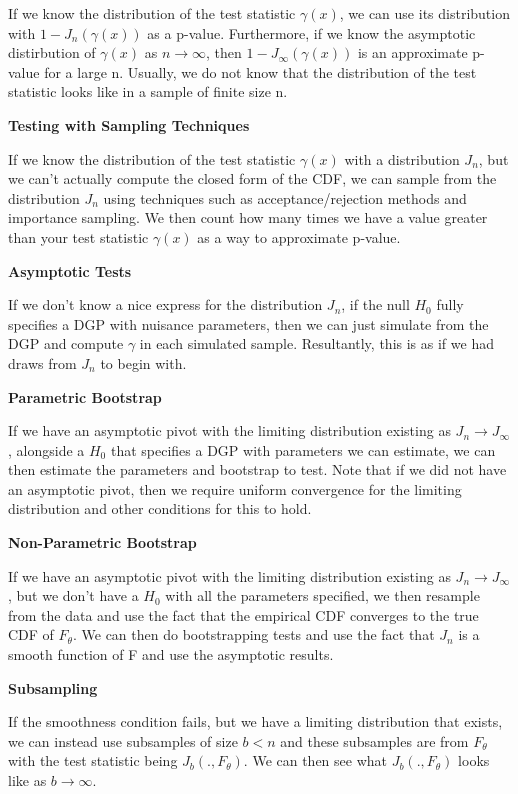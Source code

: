 \documentclass[twoside]{article}
\begin{document}
If we know the distribution of the test statistic $\gamma(x)$, we can use its distribution with $1 - J_n(\gamma(x))$ as a p-value. Furthermore, if we know the asymptotic distirbution of $\gamma(x)$ as $n \rightarrow \infty$, then $1 - J_{\infty}(\gamma(x))$ is an approximate p-value for a large n. Usually, we do not know that the distribution of the test statistic looks like in a sample of finite size n.

\bigskip
\textbf{Testing with Sampling Techniques}

If we know the distribution of the test statistic $\gamma(x)$ with a distribution $J_n$, but we can't actually compute the closed form of the CDF, we can sample from the distribution $J_n$ using techniques such as acceptance/rejection methods and importance sampling. We then count how many times we have a value greater than your test statistic $\gamma(x)$ as a way to approximate p-value. 

\bigskip
\textbf{Asymptotic Tests}

If we don't know a nice express for the distribution $J_n$, if the null $H_0$ fully specifies a DGP with nuisance parameters, then we can just simulate from the DGP and compute $\gamma$ in each simulated sample. Resultantly, this is as if we had draws from $J_n$ to begin with.

\bigskip
\textbf{Parametric Bootstrap}

If we have an asymptotic pivot with the limiting distribution existing as $J_n \rightarrow J_{\infty}$, alongside a $H_0$ that specifies a DGP with parameters we can estimate, we can then estimate the parameters and bootstrap to test. Note that if we did not have an asymptotic pivot, then we require uniform convergence for the limiting distribution and other conditions for this to hold.


\bigskip
\textbf{Non-Parametric Bootstrap}

If we have an asymptotic pivot with the limiting distribution existing as $J_n \rightarrow J_{\infty}$, but we don't have a $H_0$ with all the parameters specified, we then resample from the data and use the fact that the empirical CDF converges to the true CDF of $F_{\theta}$. We can then do bootstrapping tests and use the fact that $J_n$ is a smooth function of F and use the asymptotic results.

\bigskip
\textbf{Subsampling}

If the smoothness condition fails, but we have a limiting distribution that exists, we can instead use subsamples of size $b < n$ and these subsamples are from $F_{\theta}$ with the test statistic being $J_b(.,F_{\theta})$. We can then see what $J_b(.,F_{\theta})$ looks like as $b \rightarrow \infty$.
\end{document}
